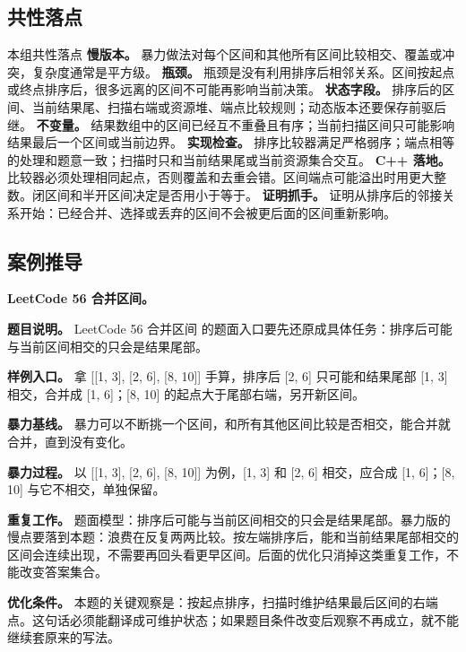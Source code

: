\subsection{共性落点}

\begin{principlebox}{本组共性落点}
\textbf{慢版本。} 暴力做法对每个区间和其他所有区间比较相交、覆盖或冲突，复杂度通常是平方级。
\textbf{瓶颈。} 瓶颈是没有利用排序后相邻关系。区间按起点或终点排序后，很多远离的区间不可能再影响当前决策。
\textbf{状态字段。} 排序后的区间、当前结果尾、扫描右端或资源堆、端点比较规则；动态版本还要保存前驱后继。
\textbf{不变量。} 结果数组中的区间已经互不重叠且有序；当前扫描区间只可能影响结果最后一个区间或当前边界。
\textbf{实现检查。} 排序比较器满足严格弱序；端点相等的处理和题意一致；扫描时只和当前结果尾或当前资源集合交互。
\textbf{C++ 落地。} 比较器必须处理相同起点，否则覆盖和去重会错。区间端点可能溢出时用更大整数。闭区间和半开区间决定是否用小于等于。
\textbf{证明抓手。} 证明从排序后的邻接关系开始：已经合并、选择或丢弃的区间不会被更后面的区间重新影响。
\end{principlebox}

\subsection{案例推导}

\noindent\textbf{LeetCode 56 合并区间。}

\textbf{题目说明。} LeetCode 56 合并区间 的题面入口要先还原成具体任务：排序后可能与当前区间相交的只会是结果尾部。

\textbf{样例入口。} 拿 [[1, 3], [2, 6], [8, 10]] 手算，排序后 [2, 6] 只可能和结果尾部 [1, 3] 相交，合并成 [1, 6]；[8, 10] 的起点大于尾部右端，另开新区间。

\textbf{暴力基线。} 暴力可以不断挑一个区间，和所有其他区间比较是否相交，能合并就合并，直到没有变化。

\textbf{暴力过程。} 以 [[1, 3], [2, 6], [8, 10]] 为例，[1, 3] 和 [2, 6] 相交，应合成 [1, 6]；[8, 10] 与它不相交，单独保留。

\textbf{重复工作。} 题面模型：排序后可能与当前区间相交的只会是结果尾部。暴力版的慢点要落到本题：浪费在反复两两比较。按左端排序后，能和当前结果尾部相交的区间会连续出现，不需要再回头看更早区间。后面的优化只消掉这类重复工作，不能改变答案集合。

\textbf{优化条件。} 本题的关键观察是：按起点排序，扫描时维护结果最后区间的右端点。这句话必须能翻译成可维护状态；如果题目条件改变后观察不再成立，就不能继续套原来的写法。

